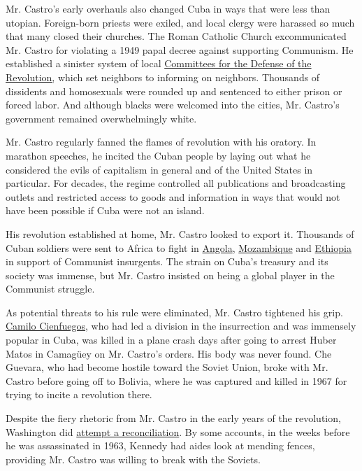 Mr. Castro's early overhauls also changed Cuba in ways that were less
than utopian. Foreign-born priests were exiled, and local clergy were
harassed so much that many closed their churches. The Roman Catholic
Church excommunicated Mr. Castro for violating a 1949 papal decree
against supporting Communism. He established a sinister system of local
\href{http://query.nytimes3xbfgragh.onion/gst/abstract.html?res=9E06E6DC1F38E73ABC4A52DFB667838E669EDE}{Committees
for the Defense of the Revolution,} which set neighbors to informing on
neighbors. Thousands of dissidents and homosexuals were rounded up and
sentenced to either prison or forced labor. And although blacks were
welcomed into the cities, Mr. Castro's government remained
overwhelmingly white.

Mr. Castro regularly fanned the flames of revolution with his oratory.
In marathon speeches, he incited the Cuban people by laying out what he
considered the evils of capitalism in general and of the United States
in particular. For decades, the regime controlled all publications and
broadcasting outlets and restricted access to goods and information in
ways that would not have been possible if Cuba were not an island.

His revolution established at home, Mr. Castro looked to export it.
Thousands of Cuban soldiers were sent to Africa to fight in
\href{http://query.nytimes3xbfgragh.onion/gst/abstract.html?res=9507E4DD1E3AEF33A25755C1A9679C946790D6CF}{Angola},
\href{http://query.nytimes3xbfgragh.onion/gst/abstract.html?res=9507E4DD1E3AEF33A25755C1A9679C946790D6CF}{Mozambique}
and
\href{http://query.nytimes3xbfgragh.onion/gst/abstract.html?res=9400E6DA1530E632A25756C2A9649C946990D6CF}{Ethiopia}
in support of Communist insurgents. The strain on Cuba's treasury and
its society was immense, but Mr. Castro insisted on being a global
player in the Communist struggle.

As potential threats to his rule were eliminated, Mr. Castro tightened
his grip.
\href{http://query.nytimes3xbfgragh.onion/mem/archive/pdf?res=9F0CE1DE1531EE3BBC4953DFB7678382649EDE}{Camilo
Cienfuegos}, who had led a division in the insurrection and was
immensely popular in Cuba, was killed in a plane crash days after going
to arrest Huber Matos in Camagüey on Mr. Castro's orders. His body was
never found. Che Guevara, who had become hostile toward the Soviet
Union, broke with Mr. Castro before going off to Bolivia, where he was
captured and killed in 1967 for trying to incite a revolution there.

Despite the fiery rhetoric from Mr. Castro in the early years of the
revolution, Washington did
\href{http://www.nytimes3xbfgragh.onion/2014/12/18/upshot/when-jfk-secretly-reached-out-to-castro.html}{attempt
a reconciliation}. By some accounts, in the weeks before he was
assassinated in 1963, Kennedy had aides look at mending fences,
providing Mr. Castro was willing to break with the Soviets.

